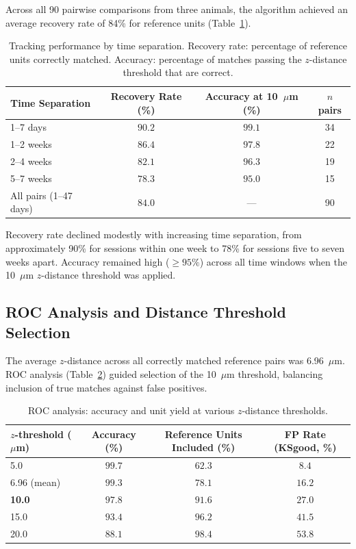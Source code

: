\documentclass[11pt]{article}
\begin{document}
Across all 90 pairwise comparisons from three animals, the algorithm achieved an average recovery rate of 84\% for reference units (Table~\ref{tab:performance}).

\begin{table}[H]
\centering
\caption{Tracking performance by time separation. Recovery rate: percentage of reference units correctly matched. Accuracy: percentage of matches passing the $z$-distance threshold that are correct.}
\label{tab:performance}
\begin{tabular}{@{}lccc@{}}
\toprule
Time Separation & Recovery Rate (\%) & Accuracy at 10~$\mu$m (\%) & $n$ pairs \\
\midrule
1--7 days & $\mathbf{90.2}$ & $\mathbf{99.1}$ & 34 \\
1--2 weeks & $86.4$ & $97.8$ & 22 \\
2--4 weeks & $82.1$ & $96.3$ & 19 \\
5--7 weeks & $78.3$ & $95.0$ & 15 \\
\midrule
All pairs (1--47 days) & $84.0$ & --- & 90 \\
\bottomrule
\end{tabular}
\end{table}

Recovery rate declined modestly with increasing time separation, from approximately 90\% for sessions within one week to 78\% for sessions five to seven weeks apart. Accuracy remained high ($\geq 95\%$) across all time windows when the 10~$\mu$m $z$-distance threshold was applied.

\subsection{ROC Analysis and Distance Threshold Selection}

The average $z$-distance across all correctly matched reference pairs was 6.96~$\mu$m. ROC analysis (Table~\ref{tab:roc}) guided selection of the 10~$\mu$m threshold, balancing inclusion of true matches against false positives.

\begin{table}[H]
\centering
\caption{ROC analysis: accuracy and unit yield at various $z$-distance thresholds.}
\label{tab:roc}
\begin{tabular}{@{}lccc@{}}
\toprule
$z$-threshold ($\mu$m) & Accuracy (\%) & Reference Units Included (\%) & FP Rate (KSgood, \%) \\
\midrule
5.0 & $99.7$ & $62.3$ & $8.4$ \\
6.96 (mean) & $99.3$ & $78.1$ & $16.2$ \\
\textbf{10.0} & $\mathbf{97.8}$ & $\mathbf{91.6}$ & $\mathbf{27.0}$ \\
15.0 & $93.4$ & $96.2$ & $41.5$ \\
20.0 & $88.1$ & $98.4$ & $53.8$ \\
\bottomrule
\end{tabular}
\end{table}
\end{document}
